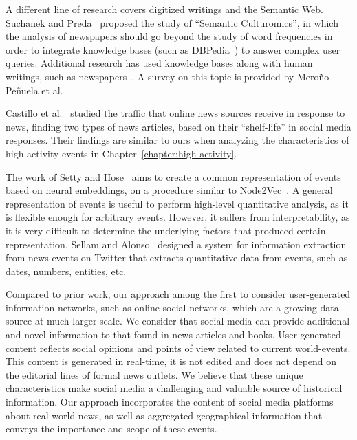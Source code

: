 A different line of research covers digitized writings and the Semantic Web.
%
Suchanek and Preda~\cite{Suchanek:2014:SC:2732977.2732994} proposed the study of
``Semantic Culturomics'', in which the analysis of newspapers should go beyond
the study of word frequencies in order to integrate knowledge bases (such as
DBPedia~\cite{dbpedia}) to answer complex user queries. 
%
Additional research has used knowledge bases along with human writings, such as
newspapers~\cite{Huet:2013:MHL:2509558.2509567,DS/CN175}. 
%
A survey on this topic is provided by Mero\~no-Pe\~nuela et
al.~\cite{merono2014semantic}.

Castillo et al.~\cite{Castillo:2014} studied the traffic
that online news sources receive in response to news, finding two types of news
articles, based on their ``shelf-life'' in social media responses. 
%
Their findings are similar to ours when analyzing the characteristics of
high-activity events in Chapter~\ref{chapter:high-activity}.
%

The work of Setty and Hose~\cite{Setty:2018:ENE:3209978.3210136} aims to create
a common representation of events based on neural embeddings, on a procedure
similar to Node2Vec~\cite{Grover:2016:NSF:2939672.2939754}.
%
A general representation of events is useful to perform high-level quantitative
analysis, as it is flexible enough for arbitrary events.
%
However, it suffers from interpretability, as it is very difficult to determine
the underlying factors that produced certain representation.
%
Sellam and Alonso~\cite{10.1007/978-3-319-19890-3_17} designed a system for
information extraction from news events on Twitter that extracts quantitative
data from events, such as dates, numbers, entities, etc.


Compared to prior work, our approach among the first to consider user-generated
information networks, such as online social networks, which are a growing data
source at much larger scale.  
%
We consider that social media can provide additional and novel information to
that found in news articles and books. 
%
User-generated content reflects social opinions and points of view related to
current world-events. 
%
This content is generated in real-time, it is not edited and does not depend on
the editorial lines of formal news outlets.  
%
We believe that these unique characteristics make social media a challenging and
valuable source of historical information.  
%
Our approach incorporates the content of social media platforms about real-world
news, as well as aggregated geographical information that conveys the importance
and scope of these events.

%
